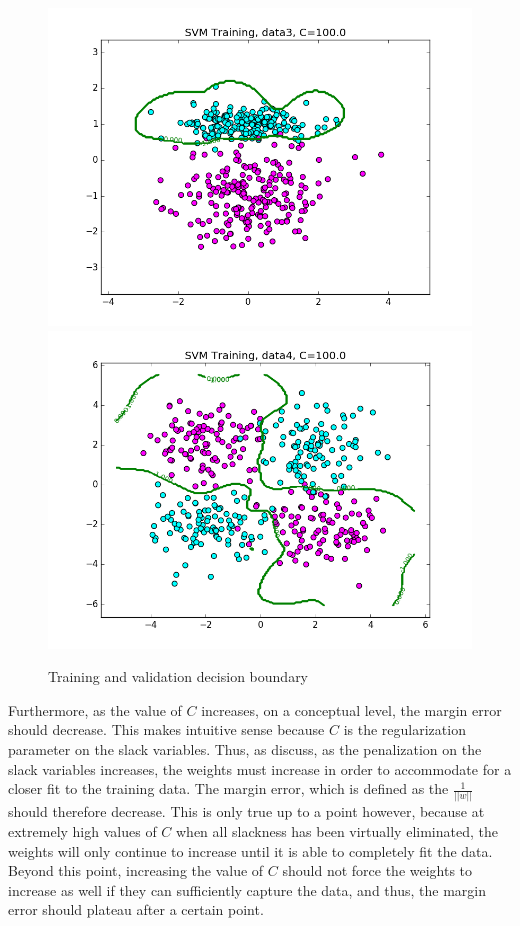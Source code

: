 \documentclass{article}
\begin{document}
\begin{figure}[width=\linewidth]
\begin{multicols}{2}
  \includegraphics[width=1.2\linewidth]{code/P2/rbf_training,C=100,data3.png}
  \includegraphics[width=1.2\linewidth]{code/P2/rbf_training,C=100,data4.png}
\end{multicols}
\caption{Training and validation decision boundary}
\end{figure}

Furthermore, as the value of $C$ increases, on a conceptual level, the margin error should decrease. This makes intuitive sense because $C$ is the regularization parameter on the slack variables. Thus, as discuss, as the penalization on the slack variables increases, the weights must increase in order to accommodate for a closer fit to the training data. The margin error, which is defined as the $\frac{1}{||w||}$ should therefore decrease. This is only true up to a point however, because at extremely high values of $C$ when all slackness has been virtually eliminated, the weights will only continue to increase until it is able to completely fit the data. Beyond this point, increasing the value of $C$ should not force the weights to increase as well if they can sufficiently capture the data, and thus, the margin error should plateau after a certain point. \\
\end{document}
